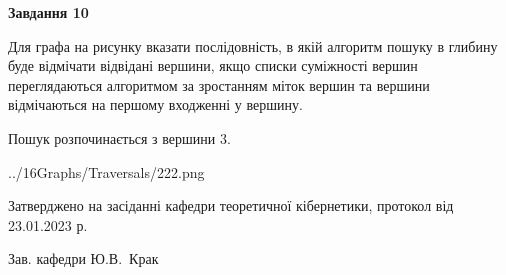 \documentclass[12pt, ukrainian]{article}
\begin{document}
{\begin {large}
{\begin {center}\textbf{Завдання 10}\end {center}}\par
Для графа на рисунку вказати послідовність, в якій алгоритм пошуку в глибину буде відмічати відвідані вершини, якщо списки суміжності вершин переглядаються алгоритмом за зростанням міток вершин та вершини відмічаються на першому вход\-женні у вершину.\par
Пошук розпочинається з вершини 3.\par

\begin{center}
	{../16Graphs/Traversals/222.png}
\end{center}\par
\newpage


\end {large}
}
{\smallskip \begin {small} Затверджено на засіданні кафедри теоретичної кібернетики, протокол  від   23.01.2023 р.\par\smallskip\smallskip
{\parbox {6.5 cm}{Зав. кафедри \dotfill Ю.В.~Крак}} \end{small}}
\end{document}
